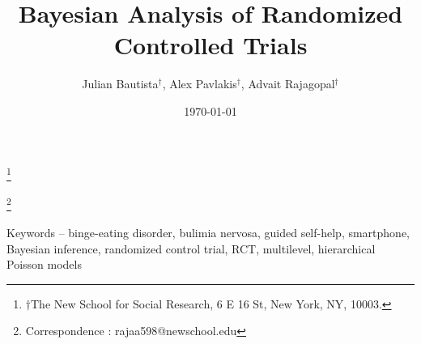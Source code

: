 \documentclass{article}
\title{Bayesian Analysis of Randomized Controlled Trials}
\author{Julian Bautista$^\dag$, Alex Pavlakis$^\dag$, Advait Rajagopal$^\dag$}
\date{\today}
\newcommand\blfootnote[1]{%
  \begingroup
  \renewcommand\thefootnote{}\footnote{#1}%
  \addtocounter{footnote}{-1}%
  \endgroup
}
\begin{document}
\maketitle
\blfootnote{$\dag$The New School for Social Research, 6 E 16 St, New York, NY, 10003.}
\blfootnote{Correspondence : rajaa598@newschool.edu}


Keywords -- binge-eating disorder, bulimia nervosa, guided self-help, smartphone, Bayesian inference, randomized control trial, RCT, multilevel, hierarchical Poisson models

\newpage
\end{document}
